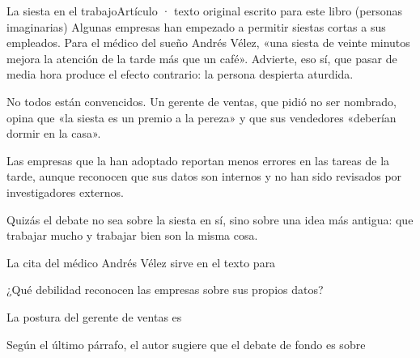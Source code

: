 \evaluacion
\begin{texto}{La siesta en el trabajo}{Artículo · texto original escrito para este libro (personas imaginarias)}
\pa Algunas empresas han empezado a permitir siestas cortas a sus empleados. Para el médico del sueño Andrés Vélez, «una
siesta de veinte minutos mejora la atención de la tarde más que un café». Advierte, eso sí, que pasar de media hora
produce el efecto contrario: la persona despierta aturdida.

\pa No todos están convencidos. Un gerente de ventas, que pidió no ser nombrado, opina que «la siesta es un premio a la
pereza» y que sus vendedores «deberían dormir en la casa».

\pa Las empresas que la han adoptado reportan menos errores en las tareas de la tarde, aunque reconocen que sus datos son
internos y no han sido revisados por investigadores externos.

\pa Quizás el debate no sea sobre la siesta en sí, sino sobre una idea más antigua: que trabajar mucho y trabajar bien son
la misma cosa.
\end{texto}
\begin{ejercicios}
\item La cita del médico Andrés Vélez sirve en el texto para
\item ¿Qué debilidad reconocen las empresas sobre sus propios datos?
\item La postura del gerente de ventas es
\item Según el último párrafo, el autor sugiere que el debate de fondo es sobre
\end{ejercicios}
